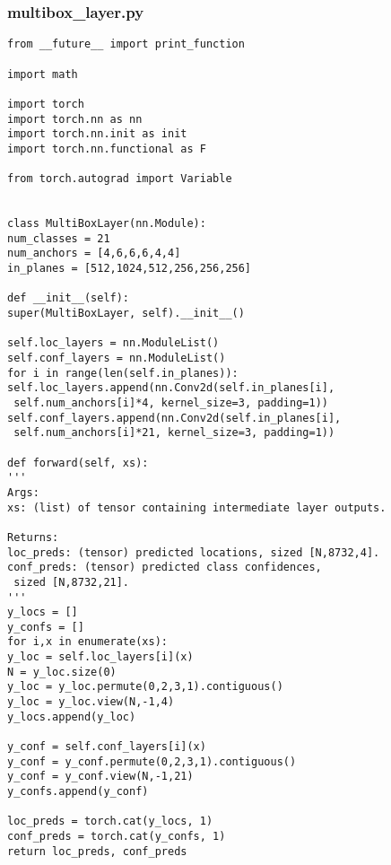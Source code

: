 \subsubsection*{multibox\_layer.py}
\begin{lstlisting}
from __future__ import print_function

import math

import torch
import torch.nn as nn
import torch.nn.init as init
import torch.nn.functional as F

from torch.autograd import Variable


class MultiBoxLayer(nn.Module):
num_classes = 21
num_anchors = [4,6,6,6,4,4]
in_planes = [512,1024,512,256,256,256]

def __init__(self):
super(MultiBoxLayer, self).__init__()

self.loc_layers = nn.ModuleList()
self.conf_layers = nn.ModuleList()
for i in range(len(self.in_planes)):
self.loc_layers.append(nn.Conv2d(self.in_planes[i],
 self.num_anchors[i]*4, kernel_size=3, padding=1))
self.conf_layers.append(nn.Conv2d(self.in_planes[i],
 self.num_anchors[i]*21, kernel_size=3, padding=1))

def forward(self, xs):
'''
Args:
xs: (list) of tensor containing intermediate layer outputs.

Returns:
loc_preds: (tensor) predicted locations, sized [N,8732,4].
conf_preds: (tensor) predicted class confidences,
 sized [N,8732,21].
'''
y_locs = []
y_confs = []
for i,x in enumerate(xs):
y_loc = self.loc_layers[i](x)
N = y_loc.size(0)
y_loc = y_loc.permute(0,2,3,1).contiguous()
y_loc = y_loc.view(N,-1,4)
y_locs.append(y_loc)

y_conf = self.conf_layers[i](x)
y_conf = y_conf.permute(0,2,3,1).contiguous()
y_conf = y_conf.view(N,-1,21)
y_confs.append(y_conf)

loc_preds = torch.cat(y_locs, 1)
conf_preds = torch.cat(y_confs, 1)
return loc_preds, conf_preds
\end{lstlisting}

